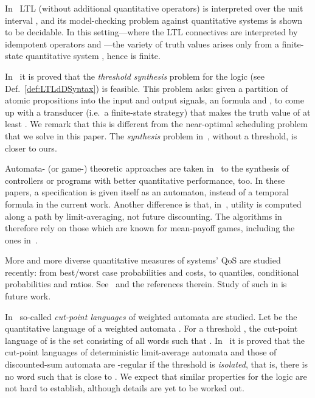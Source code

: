\documentclass[a4paper,USenglish,numberwithinsect]{lipics}
\theoremstyle{definition}
\theoremstyle{remark}
\theoremstyle{plain}
\begin{document}
In~\cite{FaellaLS08} LTL (without additional quantitative operators)
is interpreted over the unit interval , and its model-checking
problem against quantitative systems  is shown to be decidable. 
In this setting---where the LTL connectives are interpreted by
   idempotent operators 
and ---the variety of truth values arises only from a finite-state
quantitative system , hence is finite.




In~\cite[Thm.~4]{AlmagorBK14} it is proved that the \emph{threshold
synthesis} problem for the logic  (see Def.~\ref{def:LTLdDSyntax}) is feasible. This problem asks:
given a partition of atomic propositions into the input and output
signals, an  formula  and , to come up with a transducer (i.e.\ a finite-state strategy)
 that makes the truth value of  at least
. 
We remark that this is
different from the near-optimal scheduling problem that we
solve
in this paper. The \emph{synthesis} problem
in~\cite[\S{}2.2]{AlmagorBK13}, without a threshold, is closer to ours.


Automata- (or game-) theoretic approaches are  taken 
in~\cite{BloemCHJ09,CernyCHRS11}
to the synthesis of controllers or programs with better
quantitative performance, too. In these papers, a specification is 
given itself as an automaton, instead of a temporal formula in the
current work. Another difference is that, in~\cite{BloemCHJ09,CernyCHRS11}, utility is computed
along a path by limit-averaging, not future discounting. The algorithms in~\cite{BloemCHJ09,CernyCHRS11} therefore rely on 
those which are known for mean-payoff games, including the ones
in~\cite{ChatterjeeHJ05}.

More and more
diverse quantitative measures of systems' QoS are studied recently:
from best/worst case probabilities and costs, to quantiles,
conditional probabilities and ratios. See~\cite{BaierDK14} and the
references
therein.  Study of such in  is future work.

In~\cite{ChatterjeeDH10} so-called \emph{cut-point languages} of 
weighted automata are studied.
Let  be the quantitative 
language of a weighted automata .
For a threshold , the cut-point language of  is 
the set consisting of all words  such that .
In~\cite{ChatterjeeDH10} it is proved that the cut-point languages of 
deterministic limit-average automata and those of discounted-sum automata 
are -regular if the threshold  is \emph{isolated}, that is, 
there is no word  such that  is close to . 
We expect that similar properties for the logic  are not hard to
establish, although details are yet to be worked out.
\end{document}
